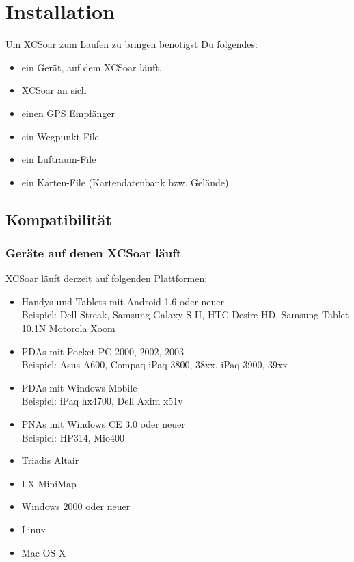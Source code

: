\chapter{Installation}\label{cha:installation}

Um {\textsf  XCSoar} zum Laufen zu bringen benötigst Du folgendes:


\begin{itemize}
\item ein Gerät, auf dem {\textsf  XCSoar} läuft.
\item {\textsf  XCSoar} an sich
\item einen GPS Empfänger
\item ein Wegpunkt-File
\item ein Luftraum-File
\item ein Karten-File (Kartendatenbank bzw. Gelände)
\end{itemize}

\section{Kompatibilität}

\subsection*{Geräte auf denen  {\textsf  XCSoar} läuft}

{\textsf  XCSoar} läuft derzeit auf folgenden Plattformen:

\begin{itemize}
\item Handys und Tablets mit Android 1.6 oder neuer\\
  Beispiel: Dell Streak, Samsung Galaxy S II, HTC Desire HD, Samsung Tablet 10.1N
  Motorola Xoom
\item PDAs mit Pocket PC 2000, 2002, 2003 \\
  Beispiel: Asus A600, Compaq iPaq 3800, 38xx, iPaq 3900, 39xx
\item PDAs mit Windows Mobile \\
  Beispiel: iPaq hx4700, Dell Axim x51v
\item PNAs mit  Windows CE 3.0 oder neuer \\
  Beispiel: HP314, Mio400
\item Triadis Altair
\item LX MiniMap
\item Windows 2000 oder neuer
\item Linux
\item Mac OS X
\end{itemize}

